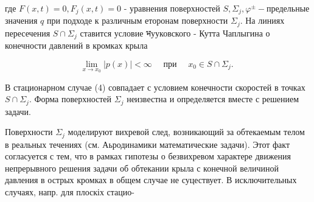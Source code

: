 \documentclass[10pt]{article}
\begin{document}
где $F(x, t)=0, F_{j}(x, t)=0$ - уравнения поверхностей $S, \Sigma_{j}, \varphi^{ \pm}-$предельные значения $q$ при подходе к различным еторонам поверхности $\Sigma_{j}$. На линиях пересечения $S \cap \Sigma_{j}$ ставится условие भууковского - Кутта Чаплыгина о конечности давлений в кромках крыла



\[

\lim _{x \rightarrow x_{0}}|p(x)|<\infty \quad \text { при } \quad x_{0} \in S \cap \Sigma_{j} \text {. }

\]



В стационарном случае (4) совпадает с условием конечности скоростей в точках $S \cap \Sigma_{j}$. Форма поверхностей $\Sigma_{j}$ неизвестна и определяется вместе с решением задачи.



Поверхности $\Sigma_{j}$ моделируют вихревой след, возникающий за обтекаемым телом в реальных течениях (см. Аьродинамики математические задачи). Этот факт согласуется с тем, что в рамках гипотезы о безвихревом характере движения непрерывного решения задачи об обтекании крыла с конечной величиной давления в острых кромках в общем случае не суцествует. В исключительных случаях, напр. для плоскіх стацио-
\end{document}
